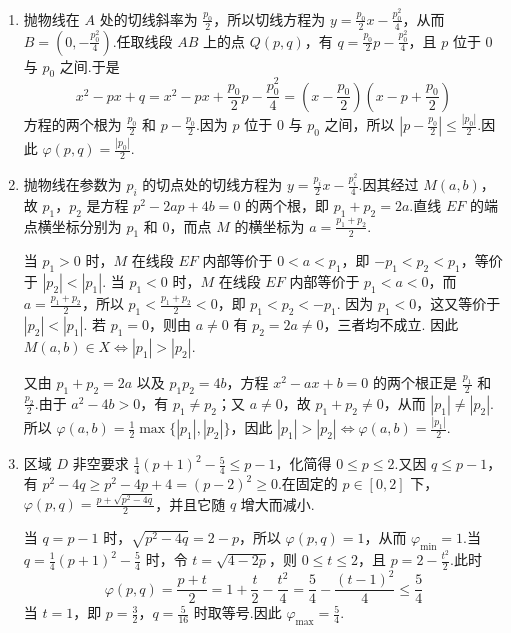 \begin{solution}
\begin{enumerate}
\item 抛物线在 \(A\) 处的切线斜率为 \(\frac{p_0}{2}\)，所以切线方程为 \(y=\frac{p_0}{2}x-\frac{p_0^2}{4}\)，从而 \(B=\left(0,-\frac{p_0^2}{4}\right)\).任取线段 \(AB\) 上的点 \(Q(p,q)\)，有 \(q=\frac{p_0}{2}p-\frac{p_0^2}{4}\)，且 \(p\) 位于 \(0\) 与 \(p_0\) 之间.于是
\[
x^2-px+q=x^2-px+\frac{p_0}{2}p-\frac{p_0^2}{4}=\left(x-\frac{p_0}{2}\right)\left(x-p+\frac{p_0}{2}\right)
\]
方程的两个根为 \(\frac{p_0}{2}\) 和 \(p-\frac{p_0}{2}\).因为 \(p\) 位于 \(0\) 与 \(p_0\) 之间，所以 \(\left\lvert p-\frac{p_0}{2}\right\rvert\leqslant\frac{|p_0|}{2}\).因此 \(\varphi(p,q)=\frac{|p_0|}{2}\).
\item 抛物线在参数为 \(p_i\) 的切点处的切线方程为 \(y=\frac{p_i}{2}x-\frac{p_i^2}{4}\).因其经过 \(M(a,b)\)，故 \(p_1\)，\(p_2\) 是方程 \(p^2-2ap+4b=0\) 的两个根，即 \(p_1+p_2=2a\).直线 \(EF\) 的端点横坐标分别为 \(p_1\) 和 \(0\)，而点 \(M\) 的横坐标为 \(a=\frac{p_1+p_2}{2}\).

当 \(p_1>0\) 时，\(M\) 在线段 \(EF\) 内部等价于 \(0<a<p_1\)，即 \(-p_1<p_2<p_1\)，等价于 \(|p_2|<|p_1|\). 当 \(p_1<0\) 时，\(M\) 在线段 \(EF\) 内部等价于 \(p_1<a<0\)，而 \(a=\frac{p_1+p_2}{2}\)，所以 \(p_1<\frac{p_1+p_2}{2}<0\)，即 \(p_1<p_2<-p_1\). 因为 \(p_1<0\)，这又等价于 \(|p_2|<|p_1|\). 若 \(p_1=0\)，则由 \(a\neq0\) 有 \(p_2=2a\neq0\)，三者均不成立. 因此 \(M(a,b)\in X\Longleftrightarrow |p_1|>|p_2|\).

又由 \(p_1+p_2=2a\) 以及 \(p_1p_2=4b\)，方程 \(x^2-ax+b=0\) 的两个根正是 \(\frac{p_1}{2}\) 和 \(\frac{p_2}{2}\).由于 \(a^2-4b>0\)，有 \(p_1\ne p_2\)；又 \(a\ne0\)，故 \(p_1+p_2\ne0\)，从而 \(|p_1|\ne|p_2|\).所以 \(\varphi(a,b)=\frac12\max\{|p_1|,|p_2|\}\)，因此 \(|p_1|>|p_2|\Longleftrightarrow\varphi(a,b)=\frac{|p_1|}{2}\).
\item 区域 \(D\) 非空要求 \(\frac14(p+1)^2-\frac54\leqslant p-1\)，化简得 \(0\leqslant p\leqslant2\).又因 \(q\leqslant p-1\)，有 \(p^2-4q\geqslant p^2-4p+4=(p-2)^2\geqslant0\).在固定的 \(p\in[0,2]\) 下，\(\varphi(p,q)=\frac{p+\sqrt{p^2-4q}}{2}\)，并且它随 \(q\) 增大而减小.

当 \(q=p-1\) 时，\(\sqrt{p^2-4q}=2-p\)，所以 \(\varphi(p,q)=1\)，从而 \(\varphi_{\min}=1\).当 \(q=\frac14(p+1)^2-\frac54\) 时，令 \(t=\sqrt{4-2p}\)，则 \(0\leqslant t\leqslant2\)，且 \(p=2-\frac{t^2}{2}\).此时
\[
\varphi(p,q)=\frac{p+t}{2}=1+\frac{t}{2}-\frac{t^2}{4}=\frac54-\frac{(t-1)^2}{4}\leqslant\frac54
\]
当 \(t=1\)，即 \(p=\frac32\)，\(q=\frac5{16}\) 时取等号.因此 \(\varphi_{\max}=\frac54\).
\end{enumerate}
\end{solution}
